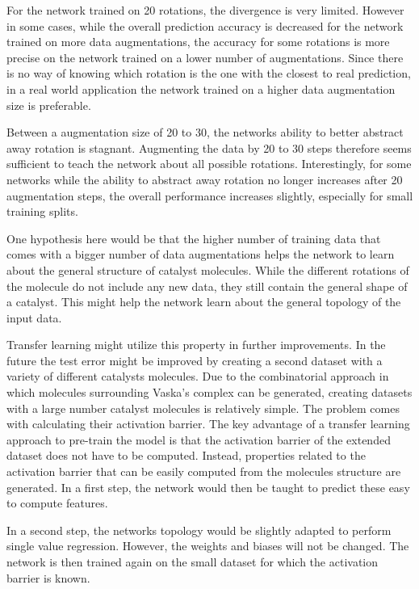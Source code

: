 For the network trained on 20 rotations, the divergence is very limited.
However in some cases, while the overall prediction accuracy is decreased for the network trained on 
more data augmentations, the accuracy for some rotations is more precise on the network trained on a lower number of augmentations.
Since there is no way of knowing which rotation is the one with the closest to real prediction, in 
a real world application the network trained on a higher data augmentation size is preferable.

Between a augmentation size of 20 to 30, the networks ability to better abstract away rotation is stagnant.
Augmenting the data by 20 to 30 steps therefore seems sufficient to teach the network about all possible rotations.
Interestingly, for some networks while the ability to abstract away rotation no longer increases after 20 augmentation 
steps, the overall performance increases slightly, especially for small training splits.

One hypothesis here would be that the higher number of training data that comes with a bigger number of data augmentations
helps the network to learn about the general structure of catalyst molecules.
While the different rotations of the molecule do not include any new data, they still contain the 
general shape of a catalyst.
This might help the network learn about the general topology of the input data.

Transfer learning might utilize this property in further improvements.
In the future the test error might be improved by creating a second dataset with a variety of different catalysts molecules.
Due to the combinatorial approach in which molecules surrounding Vaska's complex can be generated, 
creating datasets with a large number catalyst molecules is relatively simple.
The problem comes with calculating their activation barrier.
The key advantage of a transfer learning approach to pre-train the model is that the activation barrier of the extended dataset does not have to be computed.
Instead, properties related to the activation barrier that can be easily computed from the molecules structure are generated.
In a first step, the network would then be taught to predict these easy to compute features.

In a second step, the networks topology would be slightly adapted to perform single value regression.
However, the weights and biases will not be changed.
The network is then trained again on the small dataset for which the activation barrier is known.

